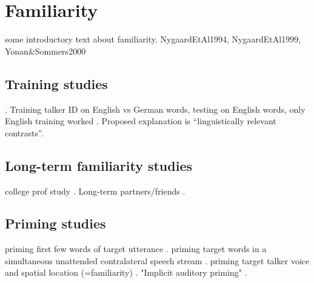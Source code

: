 

\section{Familiarity}
some introductory text about familiarity.  NygaardEtAl1994, NygaardEtAl1999, Yonan\&Sommers2000

\subsection{Training studies\label{sec:Training}}
\citep{VanEngen2012}.  
Training talker ID on English vs German words, testing on English words, only English training worked \citep{LeviEtAl2011}.  Proposed explanation is “linguistically relevant contrasts”.

\subsection{Long-term familiarity studies}
college prof study \citep{NewmanEvers2007}.  Long-term partners/friends \citep{SouzaEtAl2013}.

\subsection{Priming studies}
priming first few words of target utterance \citep{FreymanEtAl2004}.  priming target words in a simultaneous unattended contralateral speech stream \citep{RivenezEtAl2006}.  priming target talker voice and spatial location (=familiarity) \citep{KiddEtAl2005a, KitterickEtAl2010}.  "Implicit auditory priming" \citep{Sommers1999}.


